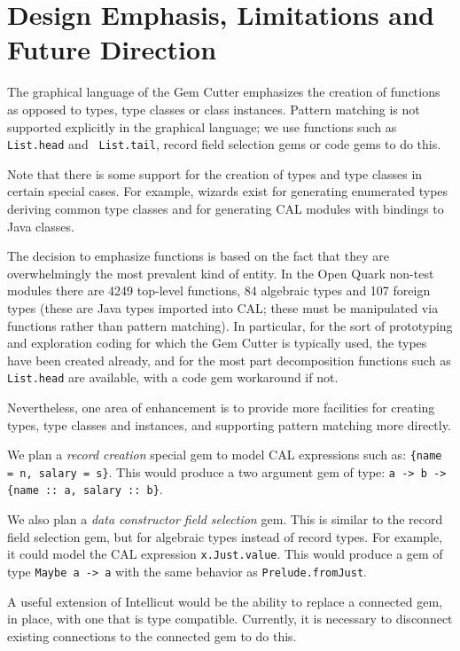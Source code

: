 \documentclass[preprint]{sigplanconf}
\begin{document}
\section{Design Emphasis, Limitations and Future Direction}
\label{sec:designEmphasis}

The graphical language of the Gem Cutter emphasizes the creation of
functions as opposed to types, type classes or class instances. 
Pattern matching is not supported explicitly in the graphical
language; we use functions such as {\tt List.head} and {\tt
List.tail}, record field selection gems or code gems to do this.

Note that there is some support for the creation of types and type
classes in certain special cases. For example, wizards exist for
generating enumerated types deriving common type classes and
for generating CAL modules with bindings to Java classes.

The decision to emphasize functions is based on the fact that they are
overwhelmingly the most prevalent kind of entity. In the Open Quark
non-test modules there are 4249 top-level functions, 84 algebraic
types and 107 foreign types (these are Java types imported into CAL;
these must be manipulated via functions rather than pattern
matching). In particular, for the sort of prototyping and exploration
coding for which the Gem Cutter is typically used, the types have been created
already, and for the most part decomposition functions such as {\tt List.head}
are available, with a code gem workaround if not.

Nevertheless, one area of enhancement is to provide more facilities
for creating types, type classes and instances, and supporting pattern
matching more directly.

We plan a {\it record creation} special gem to model CAL expressions such as:
{\tt \{name = n, salary = s\}}. This would produce a two argument gem of type:  
{\tt a -> b -> \{name :: a, salary :: b\}}.

We also plan a {\it data constructor field selection} gem. This is similar to
the record field selection gem, but for algebraic types instead of record types.
For example, it could model the CAL expression {\tt x.Just.value}. This would
produce a gem of type {\tt Maybe a -> a} with the same behavior as {\tt Prelude.fromJust}.

A useful extension of Intellicut would be the ability to replace a
connected gem, in place, with one that is type compatible. Currently,
it is necessary to disconnect existing connections to the connected gem
to do this.
\end{document}
